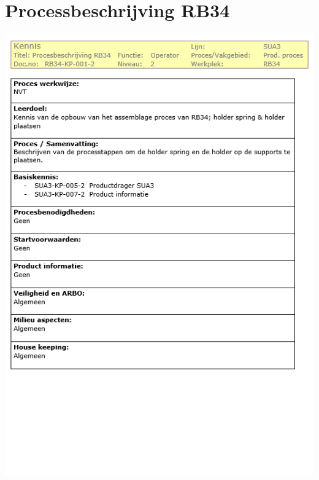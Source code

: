
\chapter{Processbeschrijving RB34} %

\label{AppendixA} %
\includegraphics[width=\textwidth]{Figures/proces1}
